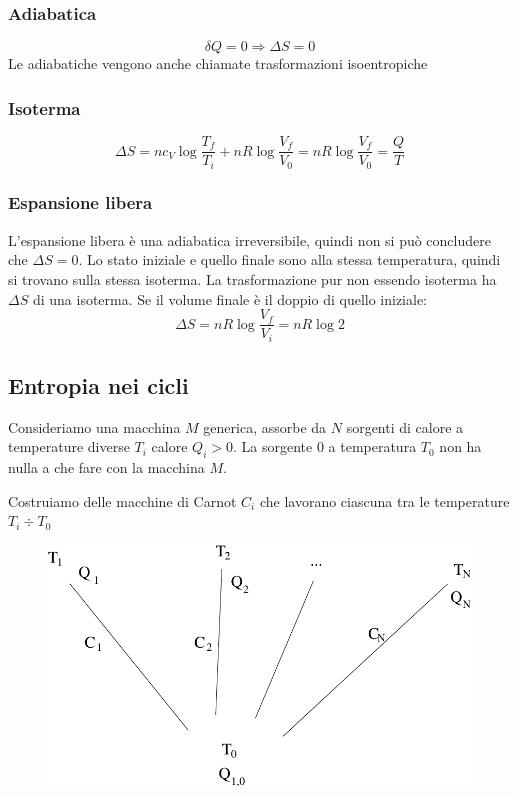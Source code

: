 \subsubsection{Adiabatica}
\begin{equation*}\delta Q=0 \Rightarrow \Delta S=0\end{equation*}
Le adiabatiche vengono anche chiamate trasformazioni isoentropiche
\subsubsection{Isoterma}
\begin{equation*}\Delta S=nc_V\log\frac{T_f}{T_i}+nR\log\frac{V_f}{V_0}=nR\log\frac{V_f}{V_0}=\frac{Q}{T}\end{equation*}
\subsubsection{Espansione libera}
L'espansione libera è una adiabatica irreversibile, quindi non si può concludere che $\Delta S=0$. Lo stato iniziale e quello finale sono alla stessa temperatura, quindi si trovano sulla stessa isoterma. La trasformazione pur non essendo isoterma ha $\Delta S$ di una isoterma. Se il volume finale è il doppio di quello iniziale:
\begin{equation*}\Delta S=nR\log\frac{V_f}{V_i}=nR\log 2\end{equation*}

\subsection{Entropia nei cicli}
Consideriamo una macchina $M$ generica, assorbe da $N$ sorgenti di calore a temperature diverse $T_i$ calore $Q_i>0$. La sorgente $0$ a temperatura $T_0$ non ha nulla a che fare con la macchina $M$.

Costruiamo delle macchine di Carnot $C_i$ che lavorano ciascuna tra le temperature $T_i\div T_0$
\begin{figure}[htbp]
\centering
\includegraphics[scale=0.5]{immagini/fisica1/hell_machine}
\end{figure}

